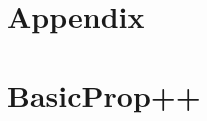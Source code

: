 \documentclass{article}
\newcommand{\e}{\mathbbm{E}}
\newcommand{\I}{\mathbbm{I}}
\begin{document}
    
    
    
    
    
    
    

\printbibliography

\newpage

\appendix

\section*{Appendix}

\section{BasicProp++}
\end{document}
